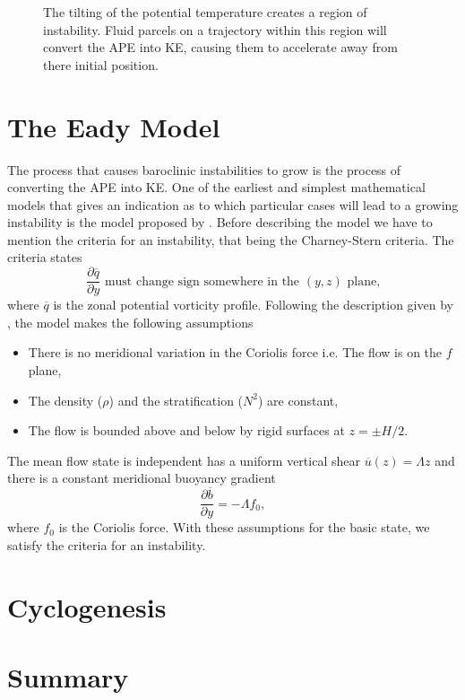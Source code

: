 \documentclass{article}
\begin{document}
\begin{figure}[hb]
  \centering
  
  \caption{The tilting of the potential temperature creates a region of instability. Fluid parcels on a trajectory within this region will convert the APE into KE, causing them to accelerate away from there initial position. }
  \label{pedloskyexample}
\end{figure}

\section{The Eady Model}
The process that causes baroclinic instabilities to grow is the process of converting the APE into KE. One of the earliest and simplest mathematical models that gives an indication as to which particular cases will lead to a growing instability is the model proposed by \cite{Eady1949}. Before describing the model we have to mention the criteria for an instability, that being the Charney-Stern criteria. The criteria states 
$$\frac{\partial\overline{q}}{\partial y}\text{ must change sign somewhere in the }(y,z)\text{ plane,} $$
where $\overline{q}$ is the zonal potential vorticity profile. 
Following the description given by \cite{Hoskins2013}, the model makes the following assumptions
\begin{itemize}
  \item There is no meridional variation in the Coriolis force i.e. The flow is on the $f$ plane,
  \item The density ($\rho$) and the stratification ($N^2$) are constant,
  \item The flow is bounded above and below by rigid surfaces at $z=\pm H/2$. 
\end{itemize}
The mean flow state is independent has a uniform vertical shear $\overline{u}(z) = \Lambda z$ and there is a constant meridional buoyancy gradient 
$$\frac{\partial\overline{b}}{\partial y} = -\Lambda f_0,$$
where $f_0$ is the Coriolis force. With these assumptions for the basic state, we satisfy the criteria for an instability. 
\begin{figure}[hb]
  \centering
  
  \caption{ }
  \label{eadyexample}
\end{figure}
\section{Cyclogenesis} 

\section{Summary}


\end{document}
